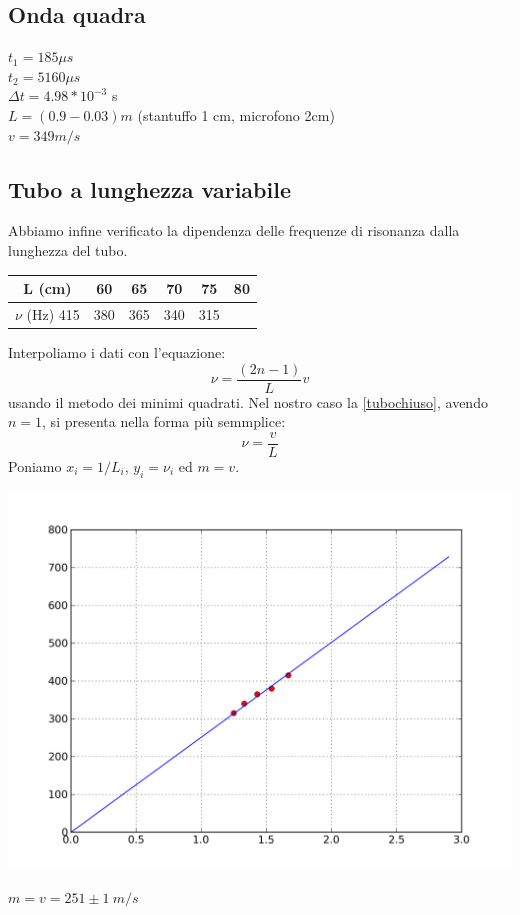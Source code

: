 \subsection{Onda quadra}
$t_1 = 185 \mu s $\\
$t_2 = 5160 \mu s $\\
$\Delta t = 4.98*10^{-3}$ s\\
$L = (0.9 - 0.03) m $ (stantuffo 1 cm, microfono 2cm)\\
$v = 349 m/s$

\subsection{Tubo a lunghezza variabile}
Abbiamo infine verificato la dipendenza delle frequenze di risonanza dalla lunghezza del tubo.

\begin{center}
\begin{tabular}{*{5}{c|}c}
L (cm) & 60 & 65 & 70 & 75 & 80 \\
\midrule
$\nu$ (Hz) 415 & 380 & 365 & 340 & 315\\
\end{tabular}
\end{center}
Interpoliamo i dati con l'equazione:
\begin{equation}\label{tubochiuso}
\nu=\frac{(2n-1)}{L}v
\end{equation} 
usando il metodo dei minimi quadrati. Nel nostro caso la \ref{tubochiuso}, avendo $n=1$, si presenta nella forma più semmplice:
$$\nu=\frac{v}{L}$$
Poniamo $x_i=1/L_i$, $y_i=\nu_i$ ed $m=v$.

\begin{center}
\includegraphics[scale=0.5]{../grafici/tubo/tubo3.png}

$m = v = 251\pm 1\ m/s$
\end{center}

